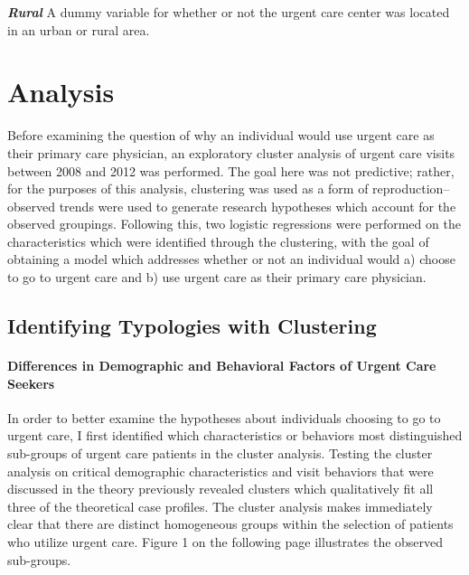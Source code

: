\documentclass[12pt,twoside]{reedthesis}
\begin{document}
  \textbf{\emph{Rural}} A dummy variable for whether or not the urgent
  care center was located in an urban or rural area.
  
  \chapter*{Analysis}\label{analysis}
  
  \setcounter{chapter}{5} \setcounter{section}{0} \doublespacing
  
  Before examining the question of why an individual would use urgent care
  as their primary care physician, an exploratory cluster analysis of
  urgent care visits between 2008 and 2012 was performed. The goal here
  was not predictive; rather, for the purposes of this analysis,
  clustering was used as a form of reproduction--observed trends were used
  to generate research hypotheses which account for the observed
  groupings. Following this, two logistic regressions were performed on
  the characteristics which were identified through the clustering, with
  the goal of obtaining a model which addresses whether or not an
  individual would a) choose to go to urgent care and b) use urgent care
  as their primary care physician.
  
  \section*{Identifying Typologies with
  Clustering}\label{identifying-typologies-with-clustering}
  
  \subsubsection*{Differences in Demographic and Behavioral Factors of
  Urgent Care
  Seekers}\label{differences-in-demographic-and-behavioral-factors-of-urgent-care-seekers}
  
  In order to better examine the hypotheses about individuals choosing to
  go to urgent care, I first identified which characteristics or behaviors
  most distinguished sub-groups of urgent care patients in the cluster
  analysis. Testing the cluster analysis on critical demographic
  characteristics and visit behaviors that were discussed in the theory
  previously revealed clusters which qualitatively fit all three of the
  theoretical case profiles. The cluster analysis makes immediately clear
  that there are distinct homogeneous groups within the selection of
  patients who utilize urgent care. Figure 1 on the following page
  illustrates the observed sub-groups.
  
\end{document}
